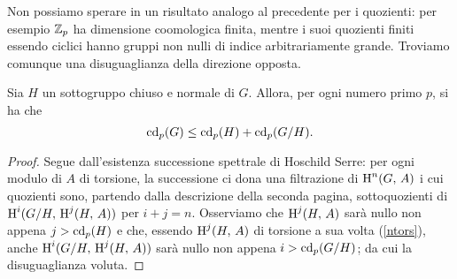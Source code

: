 Non possiamo sperare in un risultato analogo al precedente per i quozienti: per esempio $ \mathbb{Z}_p $ ha dimensione coomologica finita, mentre i suoi quozienti finiti essendo ciclici hanno gruppi non nulli di indice arbitrariamente grande. Troviamo comunque una disuguaglianza della direzione opposta.
\begin{proposition}\label{quozienti}
	Sia $ H $ un sottogruppo chiuso e normale di $ G $. Allora, per ogni numero primo $ p $, si ha che
	\[ \operatorname{cd}_p(G) \leq \operatorname{cd}_p(H) + \operatorname{cd}_p(G/H). \]
\end{proposition}
\begin{proof}
	Segue dall'esistenza successione spettrale di Hoschild Serre: per ogni modulo di $ A $ di torsione, la successione ci dona una filtrazione di $ \operatorname{H}^n(G, \, A) $ i cui quozienti sono, partendo dalla descrizione della seconda pagina, sottoquozienti di $ \operatorname{H}^i(G/H, \, \operatorname{H}^j(H, \, A)) $ per $ i+j = n $. Osserviamo che $ \operatorname{H}^j(H, \, A) $ sarà nullo non appena $ j > \operatorname{cd}_p(H) $ e che, essendo $ \operatorname{H}^j(H, \, A) $ di torsione a sua volta (\ref{ntors}), anche $ \operatorname{H}^i(G/H, \, \operatorname{H}^j(H, \, A)) $ sarà nullo non appena $ i > \operatorname{cd}_p(G/H) $; da cui la disuguaglianza voluta.
\end{proof}